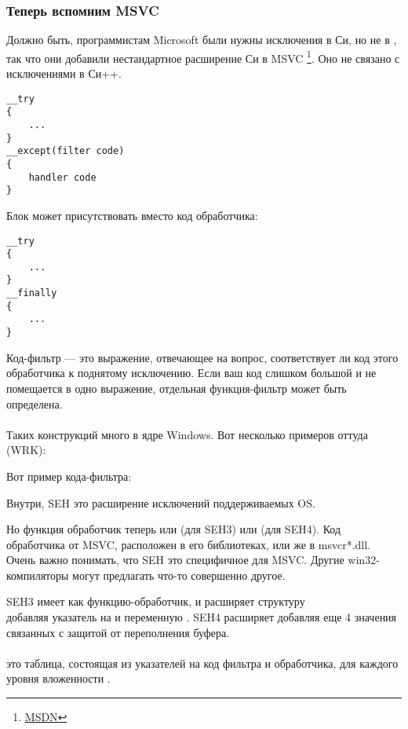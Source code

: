 \subsubsection{Теперь вспомним MSVC}

Должно быть, программистам Microsoft были нужны исключения в Си, но не в \Cpp, так что они добавили нестандартное расширение Си в MSVC
\footnote{\href{http://go.yurichev.com/17057}{MSDN}}.
Оно не связано с исключениями в Си++.

\begin{lstlisting}[style=customc]
__try
{
    ...
}
__except(filter code)
{
    handler code
}
\end{lstlisting}

Блок  может присутствовать вместо код обработчика:

\begin{lstlisting}[style=customc]
__try
{
    ...
}
__finally
{
    ...
}
\end{lstlisting}

Код-фильтр --- это выражение, отвечающее на вопрос, соответствует ли код этого обработчика к поднятому исключению.
Если ваш код слишком большой и не помещается в одно выражение, отдельная функция-фильтр может быть определена.\\
\\
Таких конструкций много в ядре Windows.
Вот несколько примеров оттуда (\ac{WRK}):





Вот пример кода-фильтра:



Внутри, SEH это расширение исключений поддерживаемых OS.

Но функция обработчик теперь или  (для SEH3) или  (для SEH4).
Код обработчика от MSVC, расположен в его библиотеках, или же в  msvcr*.dll.
Очень важно понимать, что SEH это специфичное для MSVC.
Другие win32-компиляторы могут предлагать что-то совершенно другое.


SEH3 имеет  как функцию-обработчик, и расширяет структуру \\
 добавляя указатель на 
и переменную .
SEH4 расширяет  добавляя еще 4 значения связанных с защитой от переполнения буфера.\\
\\
 это таблица, состоящая из указателей на код фильтра и обработчика, для каждого уровня вложенности .

